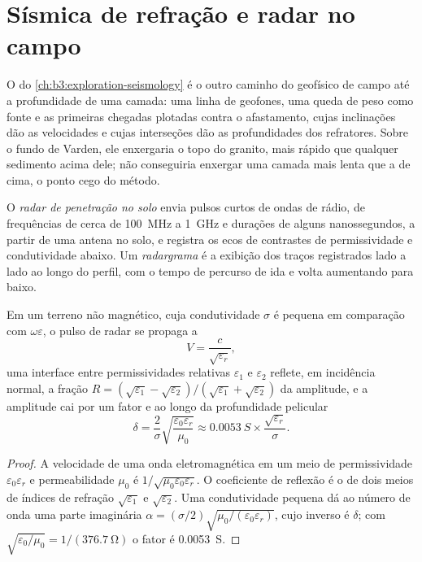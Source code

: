 \section{Sísmica de refração e radar no campo}\label{sec:b3:field-lab-methods-3:radar}

O  do \cref{ch:b3:exploration-seismology}
é o outro caminho do geofísico de campo até a profundidade de uma camada: uma linha
de geofones, uma queda de peso como fonte e as primeiras chegadas
plotadas contra o afastamento, cujas inclinações dão as velocidades e cujas
interseções dão as profundidades dos refratores. Sobre o fundo de Varden, ele
enxergaria o topo do granito, mais rápido que qualquer sedimento acima dele;
não conseguiria enxergar uma camada mais lenta que a de cima, o ponto cego do
método.

\begin{definition}\label{def:b3:field-lab-methods-3:gpr}
O \emph{radar de penetração no solo} envia
pulsos curtos de ondas de rádio, de frequências de cerca de \qty{100}{MHz}
a \qty{1}{GHz} e durações de alguns nanossegundos, a partir de uma antena no
solo, e registra os ecos de contrastes de permissividade e
condutividade abaixo. Um \emph{radargrama} é a exibição dos
traços registrados lado a lado ao longo do perfil, com o tempo de percurso
de ida e volta aumentando para baixo.
\end{definition}

\begin{proposition}\label{prop:b3:field-lab-methods-3:radar}
Em um terreno não magnético, cuja condutividade $\sigma$ é pequena
em comparação com $\omega\varepsilon$, o pulso de radar se propaga a
\[
V = \frac{c}{\sqrt{\varepsilon_r}} ,
\]
uma interface entre permissividades relativas $\varepsilon_1$ e
$\varepsilon_2$ reflete, em incidência normal, a fração $R =
(\sqrt{\varepsilon_1} - \sqrt{\varepsilon_2})/(\sqrt{\varepsilon_1} +
\sqrt{\varepsilon_2})$ da amplitude, e a amplitude cai por um
fator $\mathrm{e}$ ao longo da profundidade pelicular
\[
\delta = \frac{2}{\sigma}\sqrt{\frac{\varepsilon_0\varepsilon_r}{\mu_0}}
       \approx \qty{0.0053}{S}\times\frac{\sqrt{\varepsilon_r}}{\sigma} .
\]
\end{proposition}

\begin{proof}
A velocidade de uma onda eletromagnética em um meio de permissividade
$\varepsilon_0\varepsilon_r$ e permeabilidade $\mu_0$ é
$1/\sqrt{\mu_0\varepsilon_0\varepsilon_r}$. O coeficiente de reflexão
é o de dois meios de índices de refração $\sqrt{\varepsilon_1}$ e
$\sqrt{\varepsilon_2}$. Uma condutividade pequena dá ao número de onda uma
parte imaginária $\alpha = (\sigma/2)\sqrt{\mu_0/(\varepsilon_0
\varepsilon_r)}$, cujo inverso é $\delta$; com $\sqrt{\varepsilon_0/
\mu_0} = 1/(\qty{376.7}{\ohm})$ o fator é \qty{0.0053}{S}.
\end{proof}

